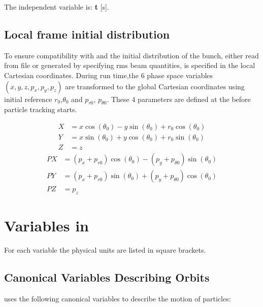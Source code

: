 The independent variable is: \textbf{t} [s].


\subsection{Local frame initial distribution}
\label{sec:opalcycl:localframe}
To ensure compatibility with \opalt and \opalmap 
the initial distribution of the bunch,
either read from file or generated by specifying rms beam quantities,
is specified in the local Cartesian coordinates.
During run time,the 6 phase space variables \((x, y, z, p_x, p_y, p_z)\) 
are transformed to the global Cartesian coordinates
using initial reference $r_0$,$\theta_0$ and $p_{r0}$, $p_{\theta 0}$.
These 4 parameters are defined at the 
before particle tracking starts. 

\begin{align*}  
X &= x\cos(\theta_0) - y\sin(\theta_0) + r_0\cos(\theta_0)  \\
Y &= x\sin(\theta_0) + y\cos(\theta_0) + r_0\sin(\theta_0)  \\
Z &= z 
\end{align*}
\begin{align*}  
PX &= (p_x+p_{r0})\cos(\theta_0) - (p_y+p_{\theta 0})\sin(\theta_0) \\
PY &= (p_x+p_{r0})\sin(\theta_0) + (p_y+p_{\theta 0})\cos(\theta_0) \\
PZ &= p_z 
\end{align*}    

\section{Variables in \opalmap}
\label{sec:variables}
For each variable the physical units are listed in square brackets.

\subsection{Canonical Variables Describing Orbits}
\label{sec:canon}
\opalmap uses the following canonical variables
to describe the motion of particles:

